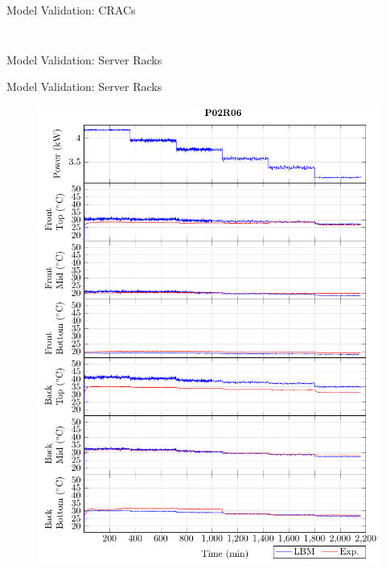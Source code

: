 \documentclass{beamer}
\begin{document}
\begin{frame}{Model Validation: CRACs}
\begin{columns}[T]
\begin{column}{.6\textwidth}
\begin{figure}[!htb]
	\end{figure}
\end{column}%
\end{columns}
\end{frame}

\begin{frame}{Model Validation: Server Racks}
\begin{table}[h]
\caption{The RMS of the difference between simulated and experimental temperatures in \degree C, and volumetric flow rate in m$^3$/s at the inlets of the four CRAC units.}
\begin{center}
\end{center}
\label{tab:rms_crac_temps}
\end{table}
\end{frame}

\begin{frame}{Model Validation: Server Racks}
	\begin{figure}[!htb]
	\includegraphics[width=0.58\linewidth]{Plots/P02R06_T.pdf}
	\end{figure}
\end{frame}
\end{document}
